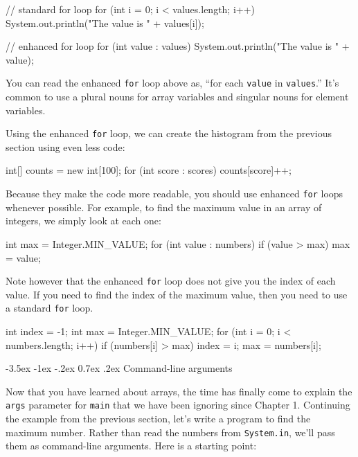 \documentclass[12pt]{book}
\makeatletter
\theoremstyle{exercise}
\newcommand{\java}[1]{\verb"#1"}
\renewcommand{\section}{\@startsection {section}{1}{\z@}%
    {-3.5ex \@plus -1ex \@minus -.2ex}%
    {0.7ex \@plus.2ex}%
    {\normalfont\Large\bfseries}}
\newcommand{\java}[1]{\lstinline{#1}} %
\makeatother
\begin{document}
\begin{code}
    // standard for loop
    for (int i = 0; i < values.length; i++) {
        System.out.println("The value is " + values[i]);
    }

    // enhanced for loop
    for (int value : values) {
        System.out.println("The value is " + value);
    }
\end{code}

You can read the enhanced \java{for} loop above as, ``for each \java{value} in \java{values}.''
It's common to use a plural nouns for array variables and singular nouns for element variables.

Using the enhanced \java{for} loop, we can create the histogram from the previous section using even less code:

\begin{code}
    int[] counts = new int[100];
    for (int score : scores) {
        counts[score]++;
    }
\end{code}

Because they make the code more readable, you should use enhanced \java{for} loops whenever possible.
For example, to find the maximum value in an array of integers, we simply look at each one:

\begin{code}
    int max = Integer.MIN_VALUE;
    for (int value : numbers) {
        if (value > max) {
            max = value;
        }
    }
\end{code}

Note however that the enhanced \java{for} loop does not give you the index of each value.
If you need to find the index of the maximum value, then you need to use a standard \java{for} loop.

\begin{code}
    int index = -1;
    int max = Integer.MIN_VALUE;
    for (int i = 0; i < numbers.length; i++) {
        if (numbers[i] > max) {
            index = i;
            max = numbers[i];
        }
    }
\end{code}


\section{Command-line arguments}

Now that you have learned about arrays, the time has finally come to explain the \java{args} parameter for \java{main} that we have been ignoring since Chapter 1.
Continuing the example from the previous section, let's write a program to find the maximum number.
Rather than read the numbers from \java{System.in}, we'll pass them as command-line arguments.
Here is a starting point:
\end{document}
